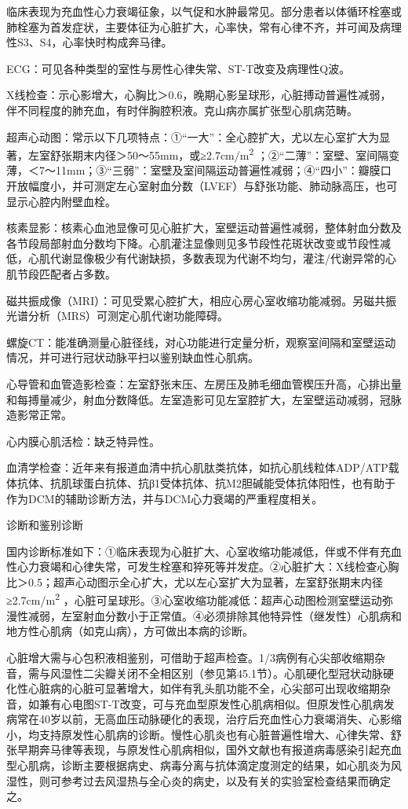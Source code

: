 临床表现为充血性心力衰竭征象，以气促和水肿最常见。部分患者以体循环栓塞或肺栓塞为首发症状，主要体征为心脏扩大，心率快，常有心律不齐，并可闻及病理性S3、S4，心率快时构成奔马律。

ECG：可见各种类型的室性与房性心律失常、ST-T改变及病理性Q波。

X线检查：示心影增大，心胸比＞0.6，晚期心影呈球形，心脏搏动普遍性减弱，伴不同程度的肺充血，有时伴胸腔积液。克山病亦属扩张型心肌病范畴。

超声心动图：常示以下几项特点：①“一大”：全心腔扩大，尤以左心室扩大为显著，左室舒张期末内径＞50～55mm，或≥2.7cm/m\textsuperscript{2}
；②“二薄”：室壁、室间隔变薄，＜7～11mm；③“三弱”：室壁及室间隔运动普遍性减弱；④“四小”：瓣膜口开放幅度小，并可测定左心室射血分数（LVEF）与舒张功能、肺动脉高压，也可显示心腔内附壁血栓。

核素显影：核素心血池显像可见心脏扩大，室壁运动普遍性减弱，整体射血分数及各节段局部射血分数均下降。心肌灌注显像则见多节段性花斑状改变或节段性减低，心肌代谢显像极少有代谢缺损，多数表现为代谢不均匀，灌注/代谢异常的心肌节段匹配者占多数。

磁共振成像（MRI）：可见受累心腔扩大，相应心房心室收缩功能减弱。另磁共振光谱分析（MRS）可测定心肌代谢功能障碍。

螺旋CT：能准确测量心脏径线，对心功能进行定量分析，观察室间隔和室壁运动情况，并可进行冠状动脉平扫以鉴别缺血性心肌病。

心导管和血管造影检查：左室舒张末压、左房压及肺毛细血管楔压升高，心排出量和每搏量减少，射血分数降低。左室造影可见左室腔扩大，左室壁运动减弱，冠脉造影常正常。

心内膜心肌活检：缺乏特异性。

血清学检查：近年来有报道血清中抗心肌肽类抗体，如抗心肌线粒体ADP/ATP载体抗体、抗肌球蛋白抗体、抗β1受体抗体、抗M2胆碱能受体抗体阳性，也有助于作为DCM的辅助诊断方法，并与DCM心力衰竭的严重程度相关。

诊断和鉴别诊断

国内诊断标准如下：①临床表现为心脏扩大、心室收缩功能减低，伴或不伴有充血性心力衰竭和心律失常，可发生栓塞和猝死等并发症。②心脏扩大：X线检查心胸比＞0.5；超声心动图示全心扩大，尤以左心室扩大为显著，左室舒张期末内径≥2.7cm/m\textsuperscript{2}
，心脏可呈球形。③心室收缩功能减低：超声心动图检测室壁运动弥漫性减弱，左室射血分数小于正常值。④必须排除其他特异性（继发性）心肌病和地方性心肌病（如克山病），方可做出本病的诊断。

心脏增大需与心包积液相鉴别，可借助于超声检查。1/3病例有心尖部收缩期杂音，需与风湿性二尖瓣关闭不全相区别（参见第45.1节）。心肌硬化型冠状动脉硬化性心脏病的心脏可显著增大，如伴有乳头肌功能不全，心尖部可出现收缩期杂音，如兼有心电图ST-T改变，可与充血型原发性心肌病相似。但原发性心肌病发病常在40岁以前，无高血压动脉硬化的表现，治疗后充血性心力衰竭消失、心影缩小，均支持原发性心肌病的诊断。慢性心肌炎也有心脏普遍性增大、心律失常、舒张早期奔马律等表现，与原发性心肌病相似，国外文献也有报道病毒感染引起充血型心肌病，诊断主要根据病史、病毒分离与抗体滴定度测定的结果，如心肌炎为风湿性，则可参考过去风湿热与全心炎的病史，以及有关的实验室检查结果而确定之。

